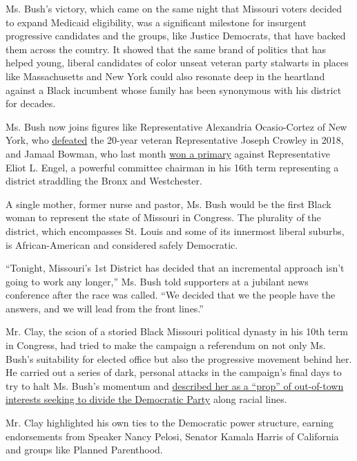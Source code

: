 Ms. Bush's victory, which came on the same night that Missouri voters
decided to expand Medicaid eligibility, was a significant milestone for
insurgent progressive candidates and the groups, like Justice Democrats,
that have backed them across the country. It showed that the same brand
of politics that has helped young, liberal candidates of color unseat
veteran party stalwarts in places like Massachusetts and New York could
also resonate deep in the heartland against a Black incumbent whose
family has been synonymous with his district for decades.

Ms. Bush now joins figures like Representative Alexandria Ocasio-Cortez
of New York, who
\href{https://www.nytimes.com/2018/06/26/nyregion/joseph-crowley-ocasio-cortez-democratic-primary.html}{defeated}
the 20-year veteran Representative Joseph Crowley in 2018, and Jamaal
Bowman, who last month
\href{https://www.nytimes.com/2020/07/17/nyregion/jamaal-bowman-eliot-engel.html}{won
a primary} against Representative Eliot L. Engel, a powerful committee
chairman in his 16th term representing a district straddling the Bronx
and Westchester.

A single mother, former nurse and pastor, Ms. Bush would be the first
Black woman to represent the state of Missouri in Congress. The
plurality of the district, which encompasses St. Louis and some of its
innermost liberal suburbs, is African-American and considered safely
Democratic.

``Tonight, Missouri's 1st District has decided that an incremental
approach isn't going to work any longer,'' Ms. Bush told supporters at a
jubilant news conference after the race was called. ``We decided that we
the people have the answers, and we will lead from the front lines.''

Mr. Clay, the scion of a storied Black Missouri political dynasty in his
10th term in Congress, had tried to make the campaign a referendum on
not only Ms. Bush's suitability for elected office but also the
progressive movement behind her. He carried out a series of dark,
personal attacks in the campaign's final days to try to halt Ms. Bush's
momentum and
\href{https://www.nytimes.com/2020/08/02/us/politics/cori-bush-william-lacy-clay-missouri.html}{described
her as a ``prop'' of out-of-town interests seeking to divide the
Democratic Party} along racial lines.

Mr. Clay highlighted his own ties to the Democratic power structure,
earning endorsements from Speaker Nancy Pelosi, Senator Kamala Harris of
California and groups like Planned Parenthood.

